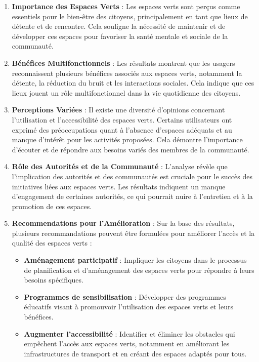 \documentclass[
]{article}
\providecommand{\tightlist}{%
  \setlength{\itemsep}{0pt}\setlength{\parskip}{0pt}}
\begin{document}
\begin{enumerate}
\def\labelenumi{\arabic{enumi}.}
\item
  \textbf{Importance des Espaces Verts} : Les espaces verts sont perçus
  comme essentiels pour le bien-être des citoyens, principalement en
  tant que lieux de détente et de rencontre. Cela souligne la nécessité
  de maintenir et de développer ces espaces pour favoriser la santé
  mentale et sociale de la communauté.
\item
  \textbf{Bénéfices Multifonctionnels} : Les résultats montrent que les
  usagers reconnaissent plusieurs bénéfices associés aux espaces verts,
  notamment la détente, la réduction du bruit et les interactions
  sociales. Cela indique que ces lieux jouent un rôle multifonctionnel
  dans la vie quotidienne des citoyens.
\item
  \textbf{Perceptions Variées} : Il existe une diversité d'opinions
  concernant l'utilisation et l'accessibilité des espaces verts.
  Certains utilisateurs ont exprimé des préoccupations quant à l'absence
  d'espaces adéquats et au manque d'intérêt pour les activités
  proposées. Cela démontre l'importance d'écouter et de répondre aux
  besoins variés des membres de la communauté.
\item
  \textbf{Rôle des Autorités et de la Communauté} : L'analyse révèle que
  l'implication des autorités et des communautés est cruciale pour le
  succès des initiatives liées aux espaces verts. Les résultats
  indiquent un manque d'engagement de certaines autorités, ce qui
  pourrait nuire à l'entretien et à la promotion de ces espaces.
\item
  \textbf{Recommendations pour l'Amélioration} : Sur la base des
  résultats, plusieurs recommandations peuvent être formulées pour
  améliorer l'accès et la qualité des espaces verts :

  \begin{itemize}
  \tightlist
  \item
    \textbf{Aménagement participatif} : Impliquer les citoyens dans le
    processus de planification et d'aménagement des espaces verts pour
    répondre à leurs besoins spécifiques.
  \item
    \textbf{Programmes de sensibilisation} : Développer des programmes
    éducatifs visant à promouvoir l'utilisation des espaces verts et
    leurs bénéfices.
  \item
    \textbf{Augmenter l'accessibilité} : Identifier et éliminer les
    obstacles qui empêchent l'accès aux espaces verts, notamment en
    améliorant les infrastructures de transport et en créant des espaces
    adaptés pour tous.
  \end{itemize}
\end{enumerate}
\end{document}
